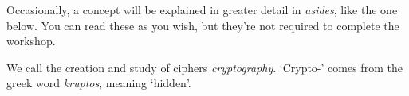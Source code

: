 Occasionally, a concept will be explained in greater detail in \textit{asides}, like the one below. You can read these as you wish, but they're not required to complete the workshop.
	
\begin{aside}[Cryptography]
	We call the creation and study of ciphers \textit{cryptography}. `Crypto-' comes from the greek word \textit{kruptos}, meaning `hidden'.
\end{aside}